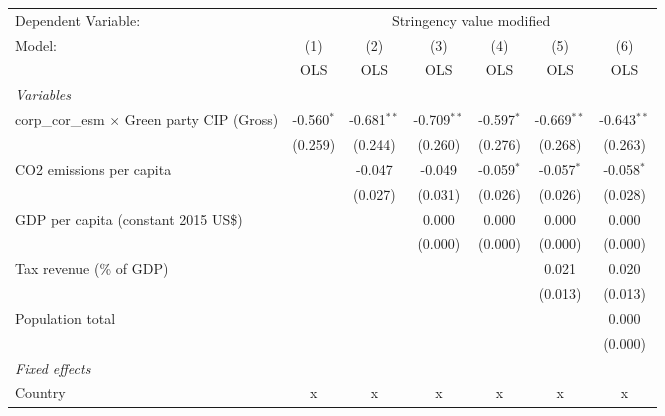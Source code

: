 
\begingroup
\centering
\begin{tabular}{lcccccc}
   \toprule
   Dependent Variable: & \multicolumn{6}{c}{Stringency value modified}\\
   Model:                                             & (1)          & (2)           & (3)           & (4)          & (5)           & (6)\\  
                                                      &  OLS         & OLS           & OLS           & OLS          & OLS           & OLS\\  
   \midrule
   \emph{Variables}\\
   corp\_cor\_esm $\times$ Green party CIP (Gross)    & -0.560$^{*}$ & -0.681$^{**}$ & -0.709$^{**}$ & -0.597$^{*}$ & -0.669$^{**}$ & -0.643$^{**}$\\   
                                                      & (0.259)      & (0.244)       & (0.260)       & (0.276)      & (0.268)       & (0.263)\\   
   CO2 emissions per capita                           &              & -0.047        & -0.049        & -0.059$^{*}$ & -0.057$^{*}$  & -0.058$^{*}$\\   
                                                      &              & (0.027)       & (0.031)       & (0.026)      & (0.026)       & (0.028)\\   
   GDP per capita (constant 2015 US\$)                &              &               & 0.000         & 0.000        & 0.000         & 0.000\\   
                                                      &              &               & (0.000)       & (0.000)      & (0.000)       & (0.000)\\   
   Tax revenue (\% of GDP)                            &              &               &               &              & 0.021         & 0.020\\   
                                                      &              &               &               &              & (0.013)       & (0.013)\\   
   Population total                                   &              &               &               &              &               & 0.000\\   
                                                      &              &               &               &              &               & (0.000)\\   
   \emph{Fixed effects}\\
   Country                                            & x            & x             & x             & x            & x             & x\\  

\end{tabular}
